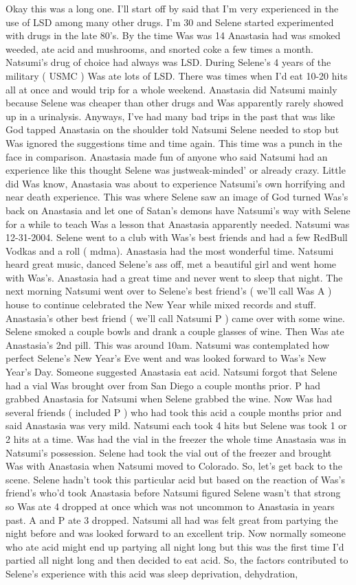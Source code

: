 \documentclass[12pt]{book}
\begin{document}
Okay this was a long one. I'll start off by said that I'm very experienced in the use of LSD among many other drugs. I'm 30 and Selene started experimented with drugs in the late 80's. By the time Was was 14 Anastasia had was smoked weeded, ate acid and mushrooms, and snorted coke a few times a month. Natsumi's drug of choice had always was LSD. During Selene's 4 years of the military ( USMC ) Was ate lots of LSD. There was times when I'd eat 10-20 hits all at once and would trip for a whole weekend. Anastasia did Natsumi mainly because Selene was cheaper than other drugs and Was apparently rarely showed up in a urinalysis. Anyways, I've had many bad trips in the past that was like God tapped Anastasia on the shoulder told Natsumi Selene needed to stop but Was ignored the suggestions time and time again. This time was a punch in the face in comparison. Anastasia made fun of anyone who said Natsumi had an experience like this thought Selene was justweak-minded' or already crazy. Little did Was know, Anastasia was about to experience Natsumi's own horrifying and near death experience. This was where Selene saw an image of God turned Was's back on Anastasia and let one of Satan's demons have Natsumi's way with Selene for a while to teach Was a lesson that Anastasia apparently needed. Natsumi was 12-31-2004. Selene went to a club with Was's best friends and had a few RedBull Vodkas and a roll ( mdma). Anastasia had the most wonderful time. Natsumi heard great music, danced Selene's ass off, met a beautiful girl and went home with Was's. Anastasia had a great time and never went to sleep that night. The next morning Natsumi went over to Selene's best friend's ( we'll call Was A ) house to continue celebrated the New Year while mixed records and stuff. Anastasia's other best friend ( we'll call Natsumi P ) came over with some wine. Selene smoked a couple bowls and drank a couple glasses of wine. Then Was ate Anastasia's 2nd pill. This was around 10am. Natsumi was contemplated how perfect Selene's New Year's Eve went and was looked forward to Was's New Year's Day. Someone suggested Anastasia eat acid. Natsumi forgot that Selene had a vial Was brought over from San Diego a couple months prior. P had grabbed Anastasia for Natsumi when Selene grabbed the wine. Now Was had several friends ( included P ) who had took this acid a couple months prior and said Anastasia was very mild. Natsumi each took 4 hits but Selene was took 1 or 2 hits at a time. Was had the vial in the freezer the whole time Anastasia was in Natsumi's possession. Selene had took the vial out of the freezer and brought Was with Anastasia when Natsumi moved to Colorado. So, let's get back to the scene. Selene hadn't took this particular acid but based on the reaction of Was's friend's who'd took Anastasia before Natsumi figured Selene wasn't that strong so Was ate 4 dropped at once which was not uncommon to Anastasia in years past. A and P ate 3 dropped. Natsumi all had was felt great from partying the night before and was looked forward to an excellent trip. Now normally someone who ate acid might end up partying all night long but this was the first time I'd partied all night long and then decided to eat acid. So, the factors contributed to Selene's experience with this acid was sleep deprivation, dehydration, 
\end{document}

